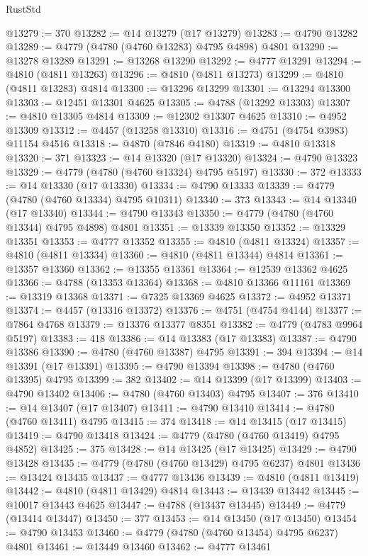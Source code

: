 \begin{lexlean}{RustStd}
\begin{coremodule}
@13279 := 370
@13282 := @14 @13279 (@17 @13279)
@13283 := @4790 @13282
@13289 := @4779 (@4780 (@4760 @13283) @4795 @4898) @4801
@13290 := @13278 @13289
@13291 := @13268 @13290
@13292 := @4777 @13291
@13294 := @4810 (@4811 @13263)
@13296 := @4810 (@4811 @13273)
@13299 := @4810 (@4811 @13283) @4814
@13300 := @13296 @13299
@13301 := @13294 @13300
@13303 := @12451 @13301 @4625
@13305 := @4788 (@13292 @13303)
@13307 := @4810 @13305 @4814
@13309 := @12302 @13307 @4625
@13310 := @4952 @13309
@13312 := @4457 (@13258 @13310)
@13316 := @4751 (@4754 @3983) @11154 @4516
@13318 := @4870 (@7846 @4180)
@13319 := @4810 @13318
@13320 := 371
@13323 := @14 @13320 (@17 @13320)
@13324 := @4790 @13323
@13329 := @4779 (@4780 (@4760 @13324) @4795 @5197)
@13330 := 372
@13333 := @14 @13330 (@17 @13330)
@13334 := @4790 @13333
@13339 := @4779 (@4780 (@4760 @13334) @4795 @10311)
@13340 := 373
@13343 := @14 @13340 (@17 @13340)
@13344 := @4790 @13343
@13350 := @4779 (@4780 (@4760 @13344) @4795 @4898) @4801
@13351 := @13339 @13350
@13352 := @13329 @13351
@13353 := @4777 @13352
@13355 := @4810 (@4811 @13324)
@13357 := @4810 (@4811 @13334)
@13360 := @4810 (@4811 @13344) @4814
@13361 := @13357 @13360
@13362 := @13355 @13361
@13364 := @12539 @13362 @4625
@13366 := @4788 (@13353 @13364)
@13368 := @4810 @13366 @11161
@13369 := @13319 @13368
@13371 := @7325 @13369 @4625
@13372 := @4952 @13371
@13374 := @4457 (@13316 @13372)
@13376 := @4751 (@4754 @4144)
@13377 := @7864 @4768
@13379 := @13376 @13377 @8351
@13382 := @4779 (@4783 @9964 @5197)
@13383 := 418
@13386 := @14 @13383 (@17 @13383)
@13387 := @4790 @13386
@13390 := @4780 (@4760 @13387) @4795
@13391 := 394
@13394 := @14 @13391 (@17 @13391)
@13395 := @4790 @13394
@13398 := @4780 (@4760 @13395) @4795
@13399 := 382
@13402 := @14 @13399 (@17 @13399)
@13403 := @4790 @13402
@13406 := @4780 (@4760 @13403) @4795
@13407 := 376
@13410 := @14 @13407 (@17 @13407)
@13411 := @4790 @13410
@13414 := @4780 (@4760 @13411) @4795
@13415 := 374
@13418 := @14 @13415 (@17 @13415)
@13419 := @4790 @13418
@13424 := @4779 (@4780 (@4760 @13419) @4795 @4852)
@13425 := 375
@13428 := @14 @13425 (@17 @13425)
@13429 := @4790 @13428
@13435 := @4779 (@4780 (@4760 @13429) @4795 @6237) @4801
@13436 := @13424 @13435
@13437 := @4777 @13436
@13439 := @4810 (@4811 @13419)
@13442 := @4810 (@4811 @13429) @4814
@13443 := @13439 @13442
@13445 := @10017 @13443 @4625
@13447 := @4788 (@13437 @13445)
@13449 := @4779 (@13414 @13447)
@13450 := 377
@13453 := @14 @13450 (@17 @13450)
@13454 := @4790 @13453
@13460 := @4779 (@4780 (@4760 @13454) @4795 @6237) @4801
@13461 := @13449 @13460
@13462 := @4777 @13461

\end{coremodule}
\end{lexlean}
